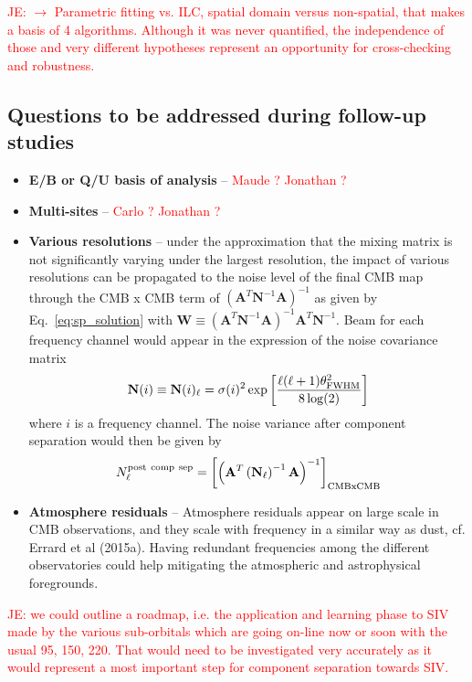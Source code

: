 \textcolor{red}{JE: $\rightarrow$ Parametric fitting vs. ILC, spatial domain versus non-spatial, that makes a basis of 4 algorithms. Although it was never quantified, the independence of those and very different hypotheses represent an opportunity for cross-checking and robustness.}

\subsection{Questions to be addressed during follow-up studies}
\begin{itemize}
	\item \textbf{E/B or Q/U basis of analysis} -- \textcolor{red}{Maude ? Jonathan ?}
	\item \textbf{Multi-sites} -- \textcolor{red}{Carlo ? Jonathan ? }
	\item \textbf{Various resolutions} -- under the approximation that the mixing matrix is not significantly varying under the largest resolution, the impact of various resolutions can be propagated to the noise level of the final CMB map through the CMB x CMB term of $\left(\mathbf{A}^T\mathbf{N}^{-1}\mathbf{A}\right)^{-1}$ as given by Eq.~\ref{eq:sp_solution} with $\mathbf{W} \equiv \left( \mathbf{A}^T\mathbf{N}^{-1}\mathbf{A} \right)^{-1}\mathbf{A}^T\mathbf{N}^{-1}$. Beam for each frequency channel would appear in the expression of the noise covariance matrix 
	\begin{eqnarray}
		\centering
			\mathbf{N}(i) \equiv \mathbf{N}(i)_\ell = \sigma(i)^2\exp\left[ \frac{\ell(\ell+1)\theta_{\rm FWHM}^2}{8\log(2)} \right]
	\end{eqnarray}
	where $i$ is a frequency channel. The noise variance after component separation would then be given by
	\begin{eqnarray}
		\centering
			N_\ell^{\rm post\ comp\ sep} = \left[\left(\mathbf{A}^T\left(\mathbf{N}_\ell\right)^{-1}\mathbf{A}\right)^{-1}\right]_{\rm CMBxCMB}
	\end{eqnarray}
	\item \textbf{Atmosphere residuals} -- Atmosphere residuals appear on large scale in CMB observations, and they scale with frequency in a similar way as dust, cf. Errard et al (2015a). Having redundant frequencies among the different observatories could help mitigating the atmospheric and astrophysical foregrounds.
\end{itemize}

\textcolor{red}{JE: we could outline a roadmap, i.e. the application and learning phase to SIV made by the various sub-orbitals which are going on-line now or soon with the usual 95, 150, 220. That would need to be investigated very accurately as it would represent a most important step for component separation towards SIV.}



%



